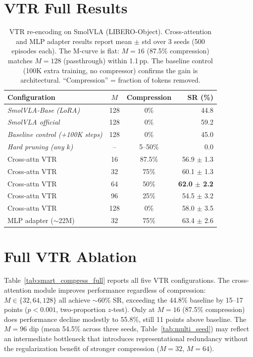 \section{VTR Full Results}
\label{app:vtr_full}

\begin{table}[ht]
\centering
\small
\caption{VTR re-encoding on SmolVLA (LIBERO-Object). Cross-attention and MLP adapter results report mean $\pm$ std over 3 seeds (500 episodes each). The M-curve is flat: $M{=}16$ (87.5\% compression) matches $M{=}128$ (passthrough) within 1.1\,pp. The baseline control (100K extra training, no compressor) confirms the gain is architectural. ``Compression'' = fraction of tokens removed.}
\label{tab:vtr_results}
\begin{tabular}{lccr}
\toprule
Configuration & $M$ & Compression & SR (\%) \\
\midrule
\textit{SmolVLA-Base (LoRA)} & 128 & 0\% & 44.8 \\
\textit{SmolVLA official} & 128 & 0\% & 59.2 \\
\textit{Baseline control (+100K steps)} & 128 & 0\% & 45.0 \\
\textit{Hard pruning (any $k$)} & -- & 5--50\% & 0.0 \\
\midrule
Cross-attn VTR & 16 & 87.5\% & 56.9 $\pm$ 1.3 \\
Cross-attn VTR & 32 & 75\% & 60.1 $\pm$ 1.3 \\
Cross-attn VTR & 64 & 50\% & \textbf{62.0 $\pm$ 2.2} \\
Cross-attn VTR & 96 & 25\% & 54.5 $\pm$ 3.2 \\
Cross-attn VTR & 128 & 0\% & 58.0 $\pm$ 3.5 \\
\midrule
MLP adapter ($\sim$22M) & 32 & 75\% & 63.4 $\pm$ 2.6 \\
\bottomrule
\end{tabular}
\end{table}


\section{Full VTR Ablation}
\label{app:smart_compress_full}

Table~\ref{tab:smart_compress_full} reports all five VTR configurations. The cross-attention module improves performance regardless of compression: $M \in \{32, 64, 128\}$ all achieve $\sim$60\% SR, exceeding the 44.8\% baseline by 15--17 points ($p < 0.001$, two-proportion $z$-test). Only at $M = 16$ (87.5\% compression) does performance decline modestly to 55.8\%, still 11 points above baseline. The $M{=}96$ dip (mean 54.5\% across three seeds, Table~\ref{tab:multi_seed}) may reflect an intermediate bottleneck that introduces representational redundancy without the regularization benefit of stronger compression ($M{=}32$, $M{=}64$).


